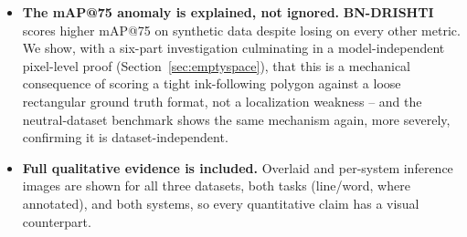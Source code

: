 \documentclass[11pt]{article}
\newcommand{\bnd}{\textbf{BN-DRISHTI}}
\begin{document}
\begin{itemize}[leftmargin=1.4em]
  0.674) -- a real, if narrower, win on genuinely foreign ground for both systems.
  \item \textbf{The mAP@75 anomaly is explained, not ignored.} \bnd{} scores higher
  mAP@75 on synthetic data despite losing on every other metric. We show, with a
  six-part investigation culminating in a model-independent pixel-level proof
  (Section~\ref{sec:emptyspace}), that this is a mechanical consequence of scoring a
  tight ink-following polygon against a loose rectangular ground truth format, not a
  localization weakness -- and the neutral-dataset benchmark shows the same mechanism
  again, more severely, confirming it is dataset-independent.
  \item \textbf{Full qualitative evidence is included.} Overlaid and per-system
  inference images are shown for all three datasets, both tasks (line/word, where
  annotated), and both systems, so every quantitative claim has a visual counterpart.
\end{itemize}
\end{document}
